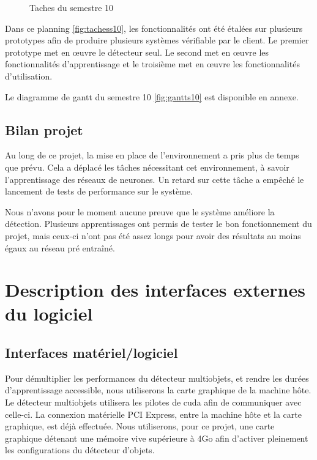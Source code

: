 \documentclass[debug,nodate,hideweeklyreports]{polytech/polytech}
\begin{document}
\begin{figure}
  \caption{Taches du semestre 10}
  \label{fig:tachess10}
\end{figure}

Dans ce planning \autoref{fig:tachess10}, les fonctionnalités ont été étalées sur plusieurs prototypes afin de produire plusieurs systèmes vérifiable par le client.
Le premier prototype met en œuvre le détecteur seul. Le second met en œuvre les fonctionnalités d’apprentissage et le troisième met en œuvre les fonctionnalités d’utilisation.

Le diagramme de gantt du semestre 10 \autoref{fig:gantts10} est disponible en annexe.

\section{Bilan projet}

Au long de ce projet, la mise en place de l'environnement a pris plus de temps que prévu. Cela a déplacé les tâches nécessitant cet environnement, à savoir l'apprentissage des réseaux de neurones. Un retard sur cette tâche a empêché le lancement de tests de performance sur le système.

Nous n'avons pour le moment aucune preuve que le système améliore la détection. Plusieurs apprentissages ont permis de tester le bon fonctionnement du projet, mais ceux-ci n'ont pas été assez longs pour avoir des résultats au moins égaux au réseau pré entraîné.

\appendix

\chapter{Description des interfaces externes du logiciel}
\label{ann:chap1}

\section{Interfaces matériel/logiciel}

Pour démultiplier les performances du détecteur multiobjets, et rendre les durées d’apprentissage accessible, nous utiliserons la carte graphique de la machine hôte. Le détecteur multiobjets utilisera les pilotes de \gls{cuda} afin de communiquer avec celle-ci. La connexion matérielle PCI Express, entre la machine hôte et la carte graphique, est déjà effectuée. Nous utiliserons, pour ce projet, une carte graphique détenant une mémoire vive supérieure à 4Go afin d’activer pleinement les configurations du détecteur d’objets.
\end{document}
